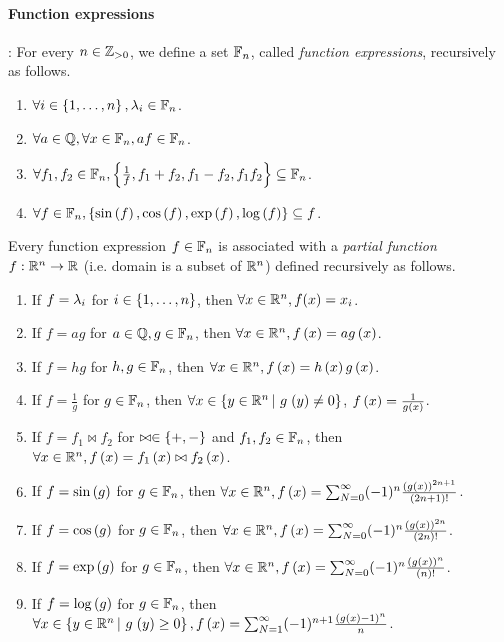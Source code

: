 \paragraph{Function expressions}:  For every $n\in\mathbb{Z}_{>0}$, we
define a set $\mathbb{F}_{n}$, called \emph{function expressions}, recursively
as follows.
%
\begin{enumerate}
\item $\forall i\in\left\{1,\ldots,n\right\}, \lambda_{i}\in\mathbb{F}_{n}$.
\item $\forall a\in\mathbb{Q}, \forall x\in\mathbb{F}_{n}, af\in \mathbb{F}_{n}$.
\item $\forall f_1,f_2\in\mathbb{F}_{n}, \left\{ \frac{1}{f}, f_1+f_2, f_1-f_2, f_1f_2\right\}\subseteq\mathbb{F}_{n}$.
\item $\forall f\in\mathbb{F}_{n}, \left\{ \sin\left(f\right), \cos\left(f\right), \exp\left(f\right), \log\left(f\right) \right\} \subseteq f$.
\end{enumerate}
%
Every function expression $f\in\mathbb{F}_{n}$ is associated with a \emph{partial
function}
$f:\mathbb{R}^n\rightarrow\mathbb{R}$ (i.e. domain is a subset of $\mathbb{R}^n$)
defined recursively as follows.
\begin{enumerate}
\item If $f = \lambda_{i}$ for $i\in\left\{1,\ldots,n\right\}$, then $\forall
x\in\mathbb{R}^n, f(x) = x_i$.
\item If $f = ag$ for $a\in\mathbb{Q}, g\in\mathbb{F}_{n}$, then $\forall
x\in\mathbb{R}^n, f\left(x\right) = ag\left(x\right)$.
\item If $f = hg$ for $h,g\in\mathbb{F}_{n}$, then $\forall x\in \mathbb{R}^n, f\left(x\right) =
h\left(x\right)g\left(x\right)$.
\item If $f = \frac{1}{g}$ for $g\in\mathbb{F}_{n}$, then $\forall
x \in\left\{y\in\mathbb{R}^n\left|~g\right.\left(y\right)\neq 0\right\}$, $f\left(x\right)
= \frac{1}{g\left(x\right)}$.
\item If $f = f_1\bowtie f_2$ for $\bowtie\in\left\{+,-\right\}$ and
$f_1,f_2\in\mathbb{F}_{n}$, then $\forall x\in \mathbb{R}^n, f\left(x\right) = f_1\left(x\right)\bowtie f_2\left(x\right)$.
\item If $f = \sin\left(g\right)$ for $g\in\mathbb{F}_{n}$, then $\forall x\in \mathbb{R}^n, f\left(x\right) = \sum_{N=0}^\infty(-1)^n\frac{\left(g\left(x\right)\right)^{2n+1}}{\left(2n+1\right)!}$.
\item If $f = \cos\left(g\right)$ for $g\in\mathbb{F}_{n}$, then $\forall x\in \mathbb{R}^n, f\left(x\right)
= \sum_{N=0}^\infty (-1)^n\frac{\left(g\left(x\right)\right)^{2n}}{\left(2n\right)!}$.
\item If $f = \exp\left(g\right)$ for $g\in\mathbb{F}_{n}$, then $\forall x\in \mathbb{R}^n, f\left(x\right)
= \sum_{N=0}^\infty(-1)^n\frac{\left(g\left(x\right)\right)^{n}}{\left(n\right)!}$.
\item If $f = \log\left(g\right)$ for $g\in\mathbb{F}_{n}$, then\\ $\forall
x \in\left\{y\in\mathbb{R}^n\left|~g\right.\left(y\right)\geq 0\right\}, f\left(x\right)
= \sum_{N=1}^\infty(-1)^{n+1}\frac{\left(g\left(x\right)-1\right)^{n}}{n}$.
\end{enumerate}
